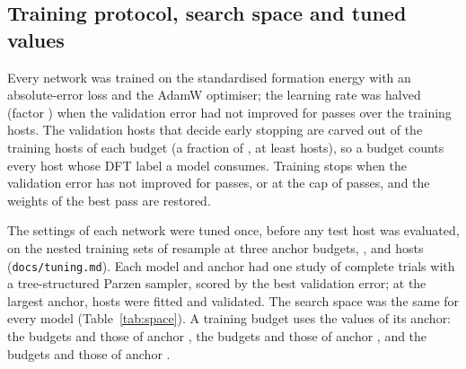\subsection{Training protocol, search space and tuned values}

Every network was trained on the standardised formation energy with an absolute-error loss and the AdamW
optimiser; the learning rate was halved (factor \numCfgTrainingSchedulerFactor{}) when the validation error had
not improved for \numCfgTrainingSchedulerPatience{} passes over the training hosts. The validation hosts that
decide early stopping are carved out of the training hosts of each budget (a fraction of
\numCfgTrainingValidationFrac{}, at least \numCfgTrainingValidationMinHosts{} hosts), so a budget counts every
host whose DFT label a model consumes. Training stops when the validation error has not improved for
\numCfgTrainingEarlyStoppingPatience{} passes, or at the cap of \numCfgTrainingMaxEpochs{} passes, and the weights
of the best pass are restored.

The settings of each network were tuned once, before any test host was evaluated, on the nested training sets of
resample \numCfgTuningAnchorResample{} at three anchor budgets, \numCfgTuningAnchorsItemOne{},
\numCfgTuningAnchorsItemTwo{} and \numCfgTuningAnchorsItemThree{} hosts (\texttt{docs/tuning.md}). Each model and
anchor had one study of \numCfgTuningOptunaTrialsPerModelPerAnchor{} complete trials with a tree-structured
Parzen sampler, scored by the best validation error; at the largest anchor, \numTuningSummaryStudiesSASixHundredFiftyFourValidationNTrainHosts{}
hosts were fitted and \numTuningSummaryStudiesSASixHundredFiftyFourValidationNValHosts{} validated. The search
space was the same for every model (Table~\ref{tab:space}). A training budget uses the values of its anchor: the
budgets \numCfgBudgetsHostsItemOne{} and \numCfgBudgetsHostsItemTwo{} those of anchor
\numCfgTuningBudgetToAnchorTwentyFive{}, the budgets \numCfgBudgetsHostsItemThree{} and
\numCfgBudgetsHostsItemFour{} those of anchor \numCfgTuningBudgetToAnchorOneHundred{}, and the budgets
\numCfgBudgetsHostsItemFive{} and \numCfgBudgetsHostsItemSix{} those of anchor
\numCfgTuningBudgetToAnchorFourHundred{}.


